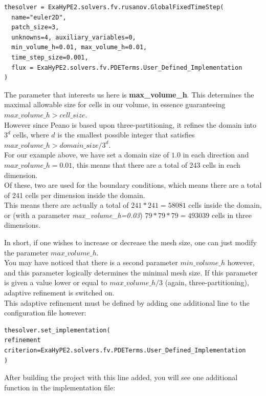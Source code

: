 \documentclass[12pt,letterpaper]{article}
\begin{document}
\begin{lstlisting}[style = Python]
thesolver = ExaHyPE2.solvers.fv.rusanov.GlobalFixedTimeStep(
  name="euler2D",
  patch_size=3,
  unknowns=4, auxiliary_variables=0,
  min_volume_h=0.01, max_volume_h=0.01,
  time_step_size=0.001,
  flux = ExaHyPE2.solvers.fv.PDETerms.User_Defined_Implementation
)
\end{lstlisting}

The parameter that interests us here is \textbf{max\_volume\_h}. This determines the maximal allowable size for cells in our volume, in essence guaranteeing $max\_volume\_h > cell\_size$.\\
However since Peano is based upon three-partitioning, it refines the domain into $3^d$ cells, where $d$ is the smallest possible integer that satisfies $max\_volume\_h > domain\_size / 3^d$.\\
For our example above, we have set a domain size of $1.0$ in each direction and $max\_volume\_h = 0.01$, this means that there are a total of 243 cells in each dimension.\\
Of these, two are used for the boundary conditions, which means there are a total of 241 cells per dimension inside the domain.\\
This means there are actually a total of $241*241=58081$ cells inside the domain, or (with a parameter \textit{max\_volume\_h=0.03}) $79*79*79=493039$ cells in three dimensions.

In short, if one wishes to increase or decrease the mesh size, one can just modify the parameter $max\_volume\_h$.\\
You may have noticed that there is a second parameter $min\_volume\_h$ however, and this parameter logically determines the minimal mesh size. If this parameter is given a value lower or equal to $max\_volume\_h / 3$ (again, three-partitioning), adaptive refinement is switched on.\\
This adaptive refinement must be defined by adding one additional line to the configuration file however:\\

\begin{lstlisting}[style = Python]
thesolver.set_implementation(
refinement criterion=ExaHyPE2.solvers.fv.PDETerms.User_Defined_Implementation
)
\end{lstlisting}

After building the project with this line added, you will see one additional function in the implementation file:
\end{document}
